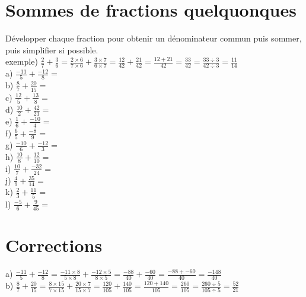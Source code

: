 \documentclass{article}
\begin{document}
\huge

\section*{Sommes de fractions quelquonques}
Développer chaque fraction pour obtenir un dénominateur commun puis sommer, puis simplifier si possible.\\
exemple) $\frac{2}{7}+\frac{3}{6}=\frac{2\times6}{7\times6}+\frac{3\times7}{6\times7}=\frac{12}{42}+\frac{21}{42}=\frac{12+21}{42}=\frac{33}{42}=\frac{33\div3}{42\div3}=\frac{11}{14}$\\ 


a) $\frac{-11}{5}+\frac{-12}{8}=$\\ 

b) $\frac{8}{7}+\frac{20}{15}=$\\ 

c) $\frac{12}{5}+\frac{13}{8}=$\\ 

d) $\frac{10}{2}+\frac{42}{21}=$\\ 

e) $\frac{1}{6}+\frac{-10}{4}=$\\ 

f) $\frac{6}{5}+\frac{-8}{9}=$\\ 

g) $\frac{-10}{6}+\frac{-12}{3}=$\\ 

h) $\frac{10}{8}+\frac{12}{10}=$\\ 

i) $\frac{10}{7}+\frac{-32}{24}=$\\ 

j) $\frac{4}{9}+\frac{35}{14}=$\\ 

k) $\frac{2}{3}+\frac{11}{5}=$\\ 

l) $\frac{-5}{6}+\frac{9}{45}=$\\ 

\section*{Corrections}
a) $\frac{-11}{5}+\frac{-12}{8}=\frac{-11\times8}{5\times8}+\frac{-12\times5}{8\times5}=\frac{-88}{40}+\frac{-60}{40}=\frac{-88+-60}{40}=\frac{-148}{40}$\\ 

b) $\frac{8}{7}+\frac{20}{15}=\frac{8\times15}{7\times15}+\frac{20\times7}{15\times7}=\frac{120}{105}+\frac{140}{105}=\frac{120+140}{105}=\frac{260}{105}=\frac{260\div5}{105\div5}=\frac{52}{21}$\\ 
\end{document}
